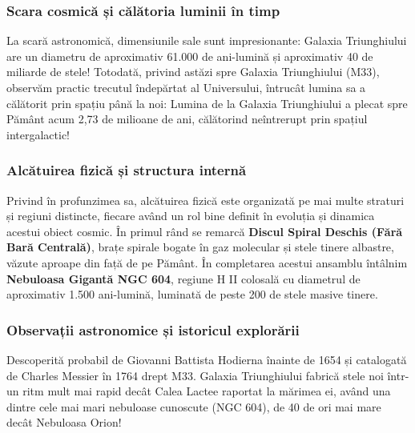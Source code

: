 \subsubsection*{Scara cosmică și călătoria luminii în timp}
La scară astronomică, dimensiunile sale sunt impresionante: Galaxia Triunghiului are un diametru de aproximativ 61.000 de ani-lumină și aproximativ 40 de miliarde de stele! Totodată, privind astăzi spre Galaxia Triunghiului (M33), observăm practic trecutul îndepărtat al Universului, întrucât lumina sa a călătorit prin spațiu până la noi: Lumina de la Galaxia Triunghiului a plecat spre Pământ acum 2,73 de milioane de ani, călătorind neîntrerupt prin spațiul intergalactic!

\subsubsection*{Alcătuirea fizică și structura internă}
Privind în profunzimea sa, alcătuirea fizică este organizată pe mai multe straturi și regiuni distincte, fiecare având un rol bine definit în evoluția și dinamica acestui obiect cosmic. În primul rând se remarcă \textbf{Discul Spiral Deschis (Fără Bară Centrală)}, brațe spirale bogate în gaz molecular și stele tinere albastre, văzute aproape din față de pe Pământ. În completarea acestui ansamblu întâlnim \textbf{Nebuloasa Gigantă NGC 604}, regiune H II colosală cu diametrul de aproximativ 1.500 ani-lumină, luminată de peste 200 de stele masive tinere.

\subsubsection*{Observații astronomice și istoricul explorării}
Descoperită probabil de Giovanni Battista Hodierna înainte de 1654 și catalogată de Charles Messier în 1764 drept M33. Galaxia Triunghiului fabrică stele noi într-un ritm mult mai rapid decât Calea Lactee raportat la mărimea ei, având una dintre cele mai mari nebuloase cunoscute (NGC 604), de 40 de ori mai mare decât Nebuloasa Orion!

